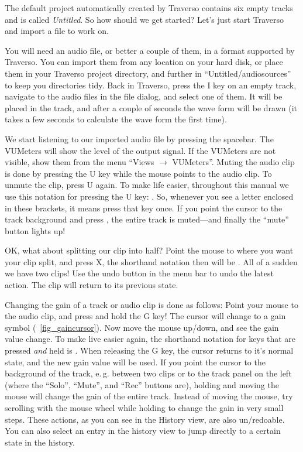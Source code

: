 The default project automatically created by Traverso contains six empty tracks and is called \emph{Untitled}. So how should we get started? Let's just start Traverso and import a file to work on.

You will need an audio file, or better a couple of them, in a format supported by Traverso. You can import them from any location on your hard disk, or place them in your Traverso project directory, and further in ``Untitled/audiosources'' to keep you directories tidy. Back in Traverso, press the I key on an empty track, navigate to the audio files in the file dialog, and select one of them. It will be placed in the track, and after a couple of seconds the wave form will be drawn (it takes a few seconds to calculate the wave form the first time).

We start listening to our imported audio file by pressing the spacebar. The VUMeters will show the level of the output signal. If the VUMeters are not visible, show them from the menu ``Views $\rightarrow$ VUMeters''. Muting the audio clip is done by pressing the U key while the mouse points to the audio clip. To unmute the clip, press U again. To make life easier, throughout this manual we use this notation for pressing the U key: . So, whenever you see a letter enclosed in these brackets, it means press that key once. If you point the cursor to the track background and press , the entire track is muted---and finally the ``mute'' button lights up!

OK, what about splitting our clip into half? Point the mouse to where you want your clip split, and press X, the shorthand notation then will be . All of a sudden we have two clips! Use the undo button in the menu bar to undo the latest action. The clip will return to its previous state.

Changing the gain of a track or audio clip is done as follows: Point your mouse to the audio clip, and press and hold the G key! The cursor will change to a gain symbol (\FigB\ \ref{fig_gaincursor}). Now move the mouse up/down, and see the gain value change. To make live easier again, the shorthand notation for keys that are pressed \emph{and} held is . When releasing the G key, the cursor returns to it's normal state, and the new gain value will be used. If you point the cursor to the background of the track, e.\,g. between two clips or to the track panel on the left (where the ``Solo'', ``Mute'', and ``Rec'' buttons are), holding  and moving the mouse will change the gain of the entire track. Instead of moving the mouse, try scrolling with the mouse wheel while holding  to change the gain in very small steps. These actions, as you can see in the History view, are also un/redoable. You can also select an entry in the history view to jump directly to a certain state in the history.

